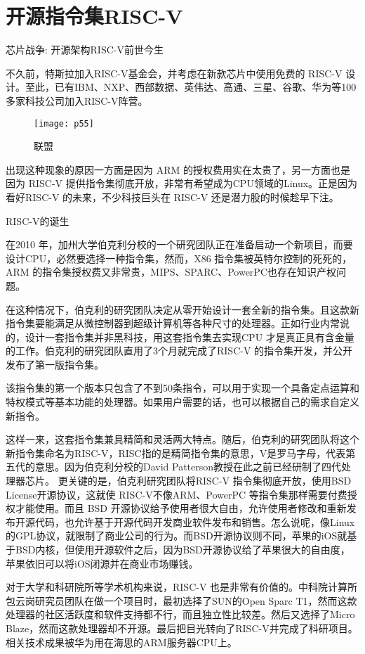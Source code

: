 \documentclass[utf8]{book}
\begin{document}
\section{开源指令集RISC-V}

芯片战争: 开源架构RISC-V前世今生

不久前，特斯拉加入RISC-V基金会，并考虑在新款芯片中使用免费的 RISC-V 设计。至此，已有IBM、NXP、西部数据、英伟达、高通、三星、谷歌、华为等100多家科技公司加入RISC-V阵营。

	\begin{figure}[H]
	\centering
	\texttt{[image: p55]}
	\caption{联盟}
	\end{figure}

出现这种现象的原因一方面是因为 ARM 的授权费用实在太贵了，另一方面也是因为 RISC-V 提供指令集彻底开放，非常有希望成为CPU领域的Linux。正是因为看好RISC-V 的未来，不少科技巨头在 RISC-V 还是潜力股的时候趁早下注。

{\LARGE RISC-V的诞生}

在2010 年，加州大学伯克利分校的一个研究团队正在准备启动一个新项目，而要设计CPU，必然要选择一种指令集，然而，X86 指令集被英特尔控制的死死的，ARM 的指令集授权费又非常贵，MIPS、SPARC、PowerPC也存在知识产权问题。

在这种情况下，伯克利的研究团队决定从零开始设计一套全新的指令集。且这款新指令集要能满足从微控制器到超级计算机等各种尺寸的处理器。正如行业内常说的，设计一套指令集并非黑科技，用这套指令集去实现CPU 才是真正具有含金量的工作。伯克利的研究团队直用了3个月就完成了RISC-V 的指令集开发，并公开发布了第一版指令集。

该指令集的第一个版本只包含了不到50条指令，可以用于实现一个具备定点运算和特权模式等基本功能的处理器。如果用户需要的话，也可以根据自己的需求自定义新指令。

这样一来，这套指令集兼具精简和灵活两大特点。随后，伯克利的研究团队将这个新指令集命名为RISC-V，RISC指的是精简指令集的意思，V是罗马字母，代表第五代的意思。因为伯克利分校的David Patterson教授在此之前已经研制了四代处理器芯片。
更关键的是，伯克利研究团队将RISC-V 指令集彻底开放，使用BSD License开源协议，这就使 RISC-V不像ARM、PowerPC 等指令集那样需要付费授权才能使用。而且 BSD 开源协议给予使用者很大自由，允许使用者修改和重新发布开源代码，也允许基于开源代码开发商业软件发布和销售。怎么说呢，像Linux 的GPL协议，就限制了商业公司的行为。而BSD开源协议则不同，苹果的iOS就基于BSD内核，但使用开源软件之后，因为BSD开源协议给了苹果很大的自由度，苹果依旧可以将iOS闭源并在商业市场赚钱。

对于大学和科研院所等学术机构来说，RISC-V 也是非常有价值的。中科院计算所包云岗研究员团队在做一个项目时，最初选择了SUN的Open Sparc T1，然而这款处理器的社区活跃度和软件支持都不行，而且独立性比较差。然后又选择了Micro Blaze，然而这款处理器却不开源。最后把目光转向了RISC-V并完成了科研项目。相关技术成果被华为用在海思的ARM服务器CPU上。
\end{document}

